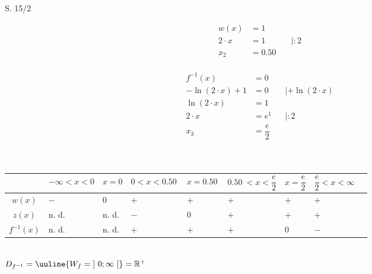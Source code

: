 \begin{Exercise}{S. 15/2}{}
\begin{enumerate}
\begin{enumerate}[label=\alph*)]
{\begin{itemize}[leftmargin=*]
{                        \hfill
                        \begin{minipage}[t]{0.20\linewidth}
                            \begin{align*}
                                w(x) &= 1 \\[2.0ex]
                                2 \cdot x &= 1 &&| :2\\[1.0ex]
                                x_{2} &= \SI{0.50}{} &&\\
                            \end{align*} 
                        \end{minipage}
                        \hfill
                        \begin{minipage}[t]{0.35\linewidth}
                            \begin{align*}
                                f^{-1}(x) &= 0 \\[2.0ex]
                                - \ln(2 \cdot x) + 1 &= 0 &&| + \ln(2 \cdot x)\\[1.5ex]
                                \ln(2 \cdot x) &= 1 && \\[1.5ex]
                                2 \cdot x &= e^{1} &&| :2\\[1.5ex]
                                x_{3} &= \dfrac{e}{2}\\
                            \end{align*} 
                        \end{minipage}\\
                        \begin{tabularx}{0.95\linewidth}{c|X|X|X|X|X|X|X|X}
                            & $-\infty < x < 0$ & $x = 0$ & $0 < x < \SI{0.50}{}$ & $x = \SI{0.50}{}$ & $\SI{0.50}{} < x < \dfrac{e}{2}$ & $x = \dfrac{e}{2}$ & $\dfrac{e}{2} < x < \infty$ \\ \hline
                            $w(x)$ & $-$ & $0$ & $+$ & $+$ & $+$ & $+$ & $+$ \\ \hline
                            $z(x)$ & n. d. & n. d. & $-$ & $0$ & $+$ & $+$ & $+$ \\ \hline
                            $f^{-1}(x)$ & n. d. & n. d. & $+$ & $+$ & $+$ & $0$ & $-$ \\                   
                        \end{tabularx}\\[3.0ex]
                        $D_{f^{-1}} = \uuline{W_{f} = \left] \ 0; \infty \ \right[} = \mathbb{R}^{+}$\\
}
\end{itemize}}
\end{enumerate}
\end{enumerate}
\end{Exercise}
